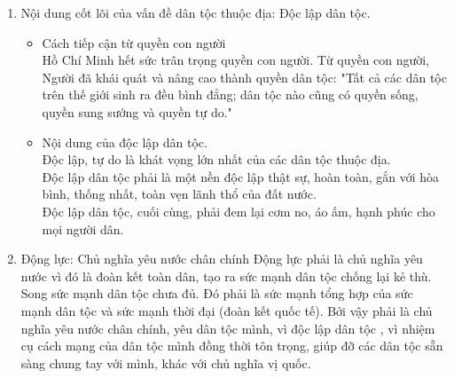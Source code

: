 \documentclass{article}
\begin{document}
\begin{enumerate}
		\item Nội dung cốt lõi của vấn đề dân tộc thuộc địa: Độc lập dân tộc.
		\begin{itemize}
			\item Cách tiếp cận từ quyền con người\\
			Hồ Chí Minh hết sức trân trọng quyền con người. Từ quyền con người, Người đã khái quát và nâng cao thành quyền dân tộc: "Tất cả các dân tộc trên thế giới sinh ra đều bình đẳng; dân tộc nào cũng có quyền sống, quyền sung sướng và quyền tự do."
			\item Nội dung của độc lập dân tộc.\\
			Độc lập, tự do là khát vọng lớn nhất của các dân tộc thuộc địa.\\
			Độc lập dân tộc phải là một nền độc lập thật sự, hoàn toàn, gắn với hòa bình, thống nhất, toàn vẹn lãnh thổ của đất nước.\\
			Độc lập dân tộc, cuối cùng, phải đem lại cơm no, áo ấm, hạnh phúc cho mọi người dân.
		\end{itemize}
		\item Động lực: Chủ nghĩa yêu nước chân chính
		Động lực phải là chủ nghĩa yêu nước vì đó là đoàn kết toàn dân, tạo ra sức mạnh dân tộc chống lại kẻ thù. Song sức mạnh dân tộc chưa đủ. Đó phải là sức mạnh tổng hợp của sức mạnh dân tộc và sức mạnh thời đại (đoàn kết quốc tế). Bởi vậy phải là chủ nghĩa yêu nước chân chính, yêu dân tộc mình, vì độc lập dân tộc , vì nhiệm cụ cách mạng của dân tộc mình đồng thời tôn trọng, giúp đỡ các dân tộc sẵn sàng chung tay với mình, khác với chủ nghĩa vị quốc.
	\end{enumerate}
\end{document}
